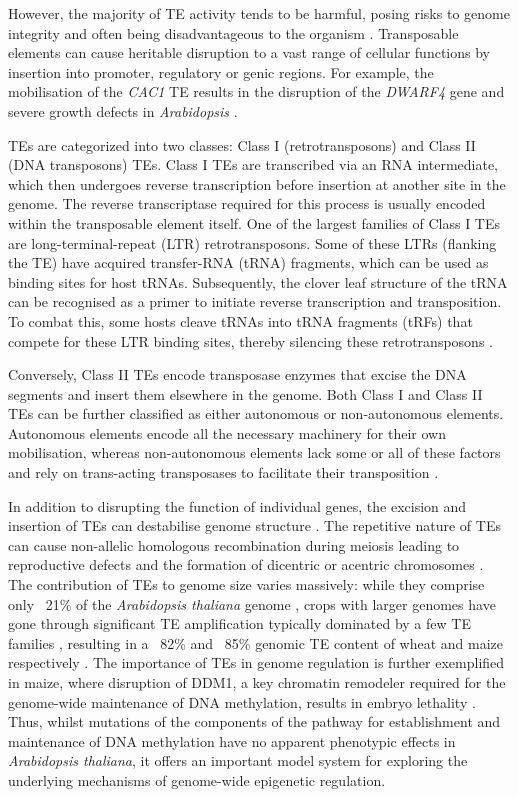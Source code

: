 However, the majority of TE activity tends to be harmful, posing risks to genome integrity and often being disadvantageous to the organism \citep{RN103}. Transposable elements can cause heritable disruption to a vast range of cellular functions by insertion into promoter, regulatory or genic regions. For example, the mobilisation of the \textit{CAC1} TE results in the disruption of the \textit{DWARF4}  gene and severe growth defects in \textit{Arabidopsis} \citep{RN105}.

TEs are categorized into two classes: Class I (retrotransposons) and Class II (DNA transposons) TEs. Class I TEs are transcribed via an RNA intermediate, which then undergoes reverse transcription before insertion at another site in the genome. The reverse transcriptase required for this process is usually encoded within the transposable element itself. One of the largest families of Class I TEs are long-terminal-repeat (LTR) retrotransposons. Some of these LTRs (flanking the TE) have acquired transfer-RNA (tRNA) fragments, which can be used as binding sites for host tRNAs. Subsequently, the clover leaf structure of the tRNA can be recognised as a primer to initiate reverse transcription and transposition. To combat this, some hosts cleave tRNAs into tRNA fragments (tRFs) that compete for these LTR binding sites, thereby silencing these retrotransposons \citep{RN66,RN67,RN68}.

Conversely, Class II TEs encode transposase enzymes that excise the DNA segments and insert them elsewhere in the genome.  Both Class I and Class II TEs can be further classified as either autonomous or non-autonomous elements. Autonomous elements encode all the necessary machinery for their own mobilisation, whereas non-autonomous elements lack some or all of these factors and rely on trans-acting transposases to facilitate their transposition \citep{RN106,RN107}.

In addition to disrupting the function of individual genes, the excision and insertion of TEs can destabilise genome structure \citep{RN103}. The repetitive nature of TEs can cause non-allelic homologous recombination during meiosis leading to reproductive defects and the formation of dicentric or acentric chromosomes \citep{RN108}. The contribution of TEs to genome size varies massively: while they comprise only ~21\% of the \textit{Arabidopsis thaliana} genome \citep{RN109},  crops with larger genomes have gone through significant TE amplification typically dominated by a few TE families \citep{RN110,RN113}, resulting in a ~82\% and ~85\% genomic TE content of wheat and maize respectively \citep{RN110,RN111}. The importance of TEs in genome regulation is further exemplified in maize, where disruption of DDM1, a key chromatin remodeler required for the genome-wide maintenance of DNA methylation, results in embryo lethality \citep{RN112}. Thus, whilst mutations of the components of the pathway for establishment and maintenance of DNA methylation have no apparent phenotypic effects in \textit{Arabidopsis thaliana}, it offers an important model system for exploring the underlying mechanisms of genome-wide epigenetic regulation.

